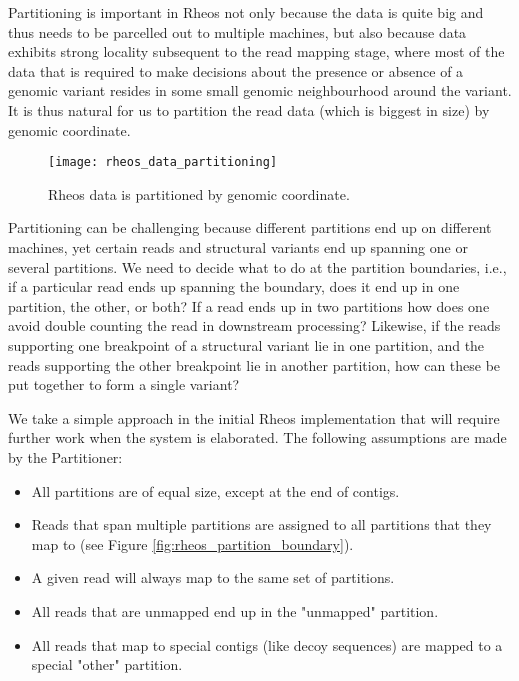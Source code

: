 Partitioning is important in Rheos not only because the data is quite big and thus needs to be parcelled out to multiple machines, but also because data exhibits strong locality subsequent to the read mapping stage, where most of the data that is required to make decisions about the presence or absence of a genomic variant resides in some small genomic neighbourhood around the variant. It is thus natural for us to partition the read data (which is biggest in size) by genomic coordinate.

\begin{figure}[H]
    \texttt{[image: rheos\_data\_partitioning]}
    \centering
    \caption {Rheos data is partitioned by genomic coordinate.}
    \label{fig:rheos_data_partitioning}
\end{figure}

Partitioning can be challenging because different partitions end up on different machines, yet certain reads and structural variants end up spanning one or several partitions. We need to decide what to do at the partition boundaries, i.e., if a particular read ends up spanning the boundary, does it end up in one partition, the other, or both? If a read ends up in two partitions how does one avoid double counting the read in downstream processing? Likewise, if the reads supporting one breakpoint of a structural variant lie in one partition, and the reads supporting the other breakpoint lie in another partition, how can these be put together to form a single variant?

We take a simple approach in the initial Rheos implementation that will require further work when the system is elaborated. The following assumptions are made by the Partitioner:

\begin{itemize}
    \item All partitions are of equal size, except at the end of contigs.
    \item Reads that span multiple partitions are assigned to all partitions that they map to (see Figure \ref{fig:rheos_partition_boundary}).
    \item A given read will always map to the same set of partitions.
    \item All reads that are unmapped end up in the "unmapped" partition.
    \item All reads that map to special contigs (like decoy sequences) are mapped to a special "other" partition.
\end{itemize}

